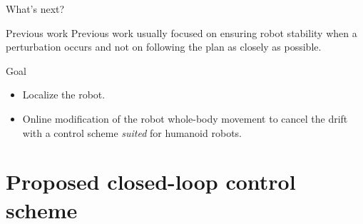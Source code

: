 \documentclass[hyperref={pdfpagelabels=false}]{beamer}
\begin{document}
\begin{frame}{What's next?}

  \begin{block}{Previous work}
    Previous work usually focused on ensuring robot stability when a
    perturbation occurs and not on following the plan as closely as
    possible.\\

    \footnotesize
    \cite{07icra.morisawa}
  \end{block}

  \begin{block}{Goal}
    \begin{itemize}
    \item Localize the robot.
    \item Online modification of the robot whole-body movement to
      cancel the drift with a control scheme \emph{suited} for
      humanoid robots.
    \end{itemize}
  \end{block}


\end{frame}


\section{Proposed closed-loop control scheme}
\end{document}
